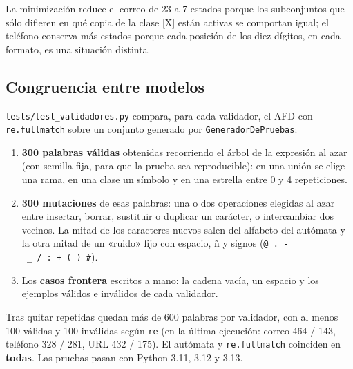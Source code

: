 La minimización reduce el correo de 23 a 7 estados porque los subconjuntos que sólo difieren en qué copia de la clase {[}X{]} están activas se comportan igual; el teléfono conserva más estados porque cada posición de los diez dígitos, en cada formato, es una situación distinta.



\hypertarget{congruencia-entre-modelos}{%
\subsection{Congruencia entre modelos}\label{congruencia-entre-modelos}}

\texttt{tests/test\_validadores.py} compara, para cada validador, el AFD con \texttt{re.fullmatch} \autocite{pythonre2026} sobre un conjunto generado por \texttt{GeneradorDePruebas}:

\begin{enumerate}
\def\labelenumi{\arabic{enumi}.}
\tightlist
\item
  \textbf{300 palabras válidas} obtenidas recorriendo el árbol de la expresión al azar (con semilla fija, para que la prueba sea reproducible): en una unión se elige una rama, en una clase un símbolo y en una estrella entre 0 y 4 repeticiones.
\item
  \textbf{300 mutaciones} de esas palabras: una o dos operaciones elegidas al azar entre insertar, borrar, sustituir o duplicar un carácter, o intercambiar dos vecinos. La mitad de los caracteres nuevos salen del alfabeto del autómata y la otra mitad de un «ruido» fijo con espacio, ñ y signos (\texttt{@\ .\ -\ \_\ /\ :\ +\ (\ )\ \#}).
\item
  Los \textbf{casos frontera} escritos a mano: la cadena vacía, un espacio y los ejemplos válidos e inválidos de cada validador.
\end{enumerate}

Tras quitar repetidas quedan más de 600 palabras por validador, con al menos 100 válidas y 100 inválidas según \texttt{re} (en la última ejecución: correo 464 / 143, teléfono 328 / 281, URL 432 / 175). El autómata y \texttt{re.fullmatch} coinciden en \textbf{todas}. Las pruebas pasan con Python 3.11, 3.12 y 3.13.

